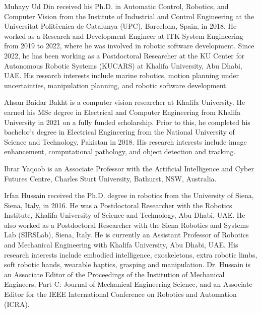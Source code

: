 \documentclass{ieeeaccess}
\begin{document}


\begin{IEEEbiography}{Muhayy Ud Din}
received his Ph.D. in Automatic Control, Robotics, and Computer Vision from the Institute of Industrial and Control Engineering at the Universitat Politècnica de Catalunya (UPC), Barcelona, Spain, in 2018. He worked as a Research and Development Engineer at ITK System Engineering from 2019 to 2022, where he was involved in robotic software development. Since 2022, he has been working as a Postdoctoral Researcher at the KU Center for Autonomous Robotic Systems (KUCARS) at Khalifa University, Abu Dhabi, UAE. His research interests include marine robotics, motion planning under uncertainties, manipulation planning, and robotic software development.
\end{IEEEbiography}
\begin{IEEEbiography}{Ahsan Baidar Bakht}
is a computer vision researcher at Khalifa University. He earned his MSc degree in Electrical and Computer Engineering from Khalifa University in 2021 on a fully funded scholarship. Prior to this, he completed his bachelor's degree in Electrical Engineering from the National University of Science and Technology, Pakistan in 2018. His research interests include image enhancement, computational pathology, and object detection and tracking.
\end{IEEEbiography}

\begin{IEEEbiography}{Ibrar Yaqoob}
\textcolor[RGB]{104,48,148}{is an Associate Professor with the Artificial Intelligence and Cyber Futures Centre, Charles Sturt University, Bathurst, NSW, Australia.}
\end{IEEEbiography}

\begin{IEEEbiography}{Irfan Hussain}
received the Ph.D. degree in robotics from the University of Siena, Siena, Italy, in 2016. He was a Postdoctoral Researcher with the Robotics Institute, Khalifa University of Science and Technology, Abu Dhabi, UAE. He also worked as a Postdoctoral Researcher with the Siena Robotics and Systems Lab (SIRSLab), Siena, Italy. He is currently an Assistant Professor of Robotics and Mechanical Engineering with Khalifa University, Abu Dhabi, UAE. His research interests include embodied intelligence, exoskeletons, extra robotic limbs, soft robotic hands, wearable haptics, grasping and manipulation. Dr. Hussain is an Associate Editor of the Proceedings of the Institution of Mechanical Engineers, Part C: Journal of Mechanical Engineering Science, and an Associate Editor for the IEEE International Conference on Robotics and Automation (ICRA).
\end{IEEEbiography}
\EOD
\end{document}
